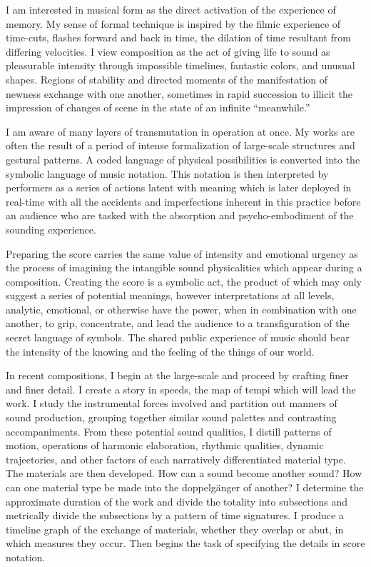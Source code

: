I am interested in musical form as the direct activation of the experience of memory. My sense of formal technique is inspired by the filmic experience of time-cuts, flashes forward and back in time, the dilation of time resultant from differing velocities. I view composition as the act of giving life to sound as pleasurable intensity through impossible timelines, fantastic colors, and unusual shapes. Regions of stability and directed moments of the manifestation of newness exchange with one another, sometimes in rapid succession to illicit the impression of changes of scene in the state of an infinite “meanwhile.”

I am aware of many layers of transmutation in operation at once. My works are often the result of a period of intense formalization of large-scale structures and gestural patterns. A coded language of physical possibilities is converted into the symbolic language of music notation. This notation is then interpreted by performers as a series of actions latent with meaning which is later deployed in real-time with all the accidents and imperfections inherent in this practice before an audience who are tasked with the absorption and psycho-embodiment of the sounding experience.

Preparing the score carries the same value of intensity and emotional urgency as the process of imagining the intangible sound physicalities which appear during a composition. Creating the score is a symbolic act, the product of which may only suggest a series of potential meanings, however interpretations at all levels, analytic, emotional, or otherwise have the power, when in combination with one another, to grip, concentrate, and lead the audience to a transfiguration of the secret language of symbols. The shared public experience of music should bear the intensity of the knowing and the feeling of the things of our world.

In recent compositions, I begin at the large-scale and proceed by crafting finer and finer detail. I create a story in speeds, the map of tempi which will lead the work. I study the instrumental forces involved and partition out manners of sound production, grouping together similar sound palettes and contrasting accompaniments. From these potential sound qualities, I distill patterns of motion, operations of harmonic elaboration, rhythmic qualities, dynamic trajectories, and other factors of each narratively differentiated material type. The materials are then developed. How can a sound become another sound? How can one material type be made into the doppelgänger of another? I determine the approximate duration of the work and divide the totality into subsections and metrically divide the subsections by a pattern of time signatures. I produce a timeline graph of the exchange of materials, whether they overlap or abut, in which measures they occur. Then begins the task of specifying the details in score notation.
